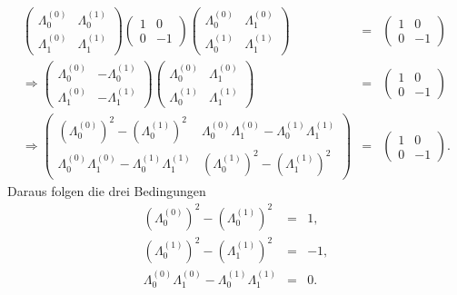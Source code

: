 \documentclass{book}
\begin{document}
\begin{eqnarray}
\left(\begin{array}{cc}
\Lambda_0^{(0)}&\Lambda_0^{\left(1\right)}\\
\Lambda_1^{(0)}&\Lambda_1^{\left(1\right)}
\end{array}\right)\left(\begin{array}{cc}
1&0\\
0& -1
\end{array}\right)\left(\begin{array}{cc}
\Lambda_0^{(0)}&\Lambda_1^{(0)}\\
\Lambda_0^{\left(1\right)}&\Lambda_1^{\left(1\right)}
\end{array}\right) & = & \left(\begin{array}{cc}
1&0\\
0& -1
\end{array}\right)\nonumber\\
\Rightarrow\left(\begin{array}{cc}
\Lambda_0^{(0)}& -\Lambda_0^{\left(1\right)}\\
\Lambda_1^{(0)}& -\Lambda_1^{\left(1\right)}
\end{array}\right)\left(\begin{array}{cc}
\Lambda_0^{(0)}&\Lambda_1^{(0)}\\
\Lambda_0^{\left(1\right)}&\Lambda_1^{\left(1\right)}
\end{array}\right) & = & \left(\begin{array}{cc}
1&0\\
0& -1
\end{array}\right)\nonumber\\
\Rightarrow\left(\begin{array}{cc}
\left(\Lambda_0^{(0)}\right)^2 - \left(\Lambda_0^{\left(1\right)}\right)^2&\Lambda_0^{(0)}\Lambda_1^{(0)} - \Lambda_0^{\left(1\right)}\Lambda_1^{\left(1\right)}\\
\Lambda_0^{(0)}\Lambda_1^{(0)} - \Lambda_0^{\left(1\right)}\Lambda_1^{\left(1\right)}&\left(\Lambda_0^{\left(1\right)}\right)^2 - \left(\Lambda_1^{\left(1\right)}\right)^2
\end{array}\right) & = & \left(\begin{array}{cc}
1&0\\
0& -1
\end{array}\right).
\end{eqnarray}
%
Daraus folgen die drei Bedingungen
%
\begin{eqnarray}
\left(\Lambda_0^{(0)}\right)^2 - \left(\Lambda_0^{\left(1\right)}\right)^2 & = & 1,\\
\left(\Lambda_0^{\left(1\right)}\right)^2 - \left(\Lambda_1^{\left(1\right)}\right)^2 & = & -1,\\
\Lambda_0^{(0)}\Lambda_1^{(0)} - \Lambda_0^{\left(1\right)}\Lambda_1^{\left(1\right)} & = & 0.
\end{eqnarray}
\end{document}
